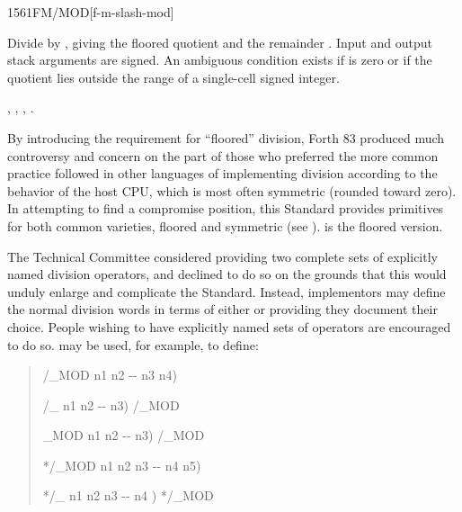 \begin{worddef}{1561}{FM/MOD}[f-m-slash-mod]
\item {}

	Divide  by , giving the floored quotient
	 and the remainder . Input and output stack
	arguments are signed. An ambiguous condition exists if
	 is zero or if the quotient lies outside the range of
	a single-cell signed integer.

\see {},
	,
	,
	.

	\begin{rationale} %
		By introducing the requirement for ``floored'' division,
		Forth 83 produced much controversy and concern on the part of
		those who preferred the more common practice followed in other
		languages of implementing division according to the behavior
		of the host CPU, which is most often symmetric (rounded toward
		zero). In attempting to find a compromise position, this
		Standard provides primitives for both common varieties, floored
		and symmetric (see ).  is the floored
		version.

		The Technical Committee considered providing two complete sets
		of explicitly named division operators, and declined to do so
		on the grounds that this would unduly enlarge and complicate
		the Standard. Instead, implementors may define the normal
		division words in terms of either  or
		 providing they document their choice. People
		wishing to have explicitly named sets of operators are
		encouraged to do so.  may be used, for example,
		to define:

		\begin{quote}\ttfamily
			\word{:} /\_MOD  n1 n2 -{}- n3 n4)
				   
			\word{;}

			\word{:} /\_  n1 n2 -{}- n3)
				/\_MOD  
			\word{;}

			\word{:} \_MOD  n1 n2 -{}- n3)
				/\_MOD 
			\word{;}

			\word{:} */\_MOD  n1 n2 n3 -{}- n4 n5)
				   
			\word{;}

			\word{:} */\_  n1 n2 n3 -{}- n4 )
				*/\_MOD  
			\word{;}
		\end{quote}
	\end{rationale}


\end{worddef}
